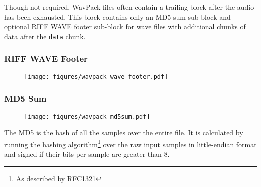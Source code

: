 Though not required, WavPack files often contain a trailing
block after the audio has been exhausted.
This block contains only an MD5 sum sub-block and optional
RIFF WAVE footer sub-block for wave files with additional chunks of
data after the \texttt{data} chunk.

\subsubsection{RIFF WAVE Footer}
\begin{figure}[h]
\texttt{[image: figures/wavpack\_wave\_footer.pdf]}
\end{figure}

\subsubsection{MD5 Sum}
\begin{figure}[h]
\texttt{[image: figures/wavpack\_md5sum.pdf]}
\end{figure}
\par
\noindent
The MD5 is the hash of all the samples over the entire file.
It is calculated by running the
hashing algorithm\footnote{As described by RFC1321} over
the raw input samples in little-endian format
and signed if their bits-per-sample are greater than 8.
